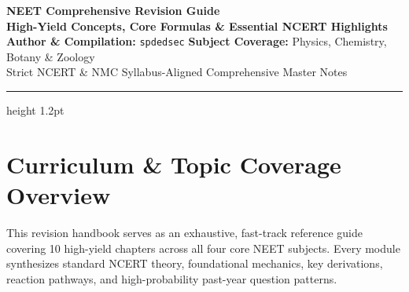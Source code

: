 \documentclass[11pt,a4paper]{article}
\begin{document}
\begin{center}
  {\huge\bfseries\color{primaryteal} NEET Comprehensive Revision Guide}\\[6pt]
  {\Large\bfseries\color{accentblue} High-Yield Concepts, Core Formulas \& Essential NCERT Highlights}\\[10pt]
  {\large\textbf{Author \& Compilation:} \texttt{spdedsec} \quad\textbar\quad \textbf{Subject Coverage:} Physics, Chemistry, Botany \& Zoology}\\[4pt]
  {\small\color{gray} Strict NCERT \& NMC Syllabus-Aligned Comprehensive Master Notes}
\end{center}
\vspace{-4pt}
\hrule height 1.2pt
\vspace{10pt}

\section*{Curriculum \& Topic Coverage Overview}

This revision handbook serves as an exhaustive, fast-track reference guide covering 10 high-yield chapters across all four core NEET subjects. Every module synthesizes standard NCERT theory, foundational mechanics, key derivations, reaction pathways, and high-probability past-year question patterns.
\end{document}
